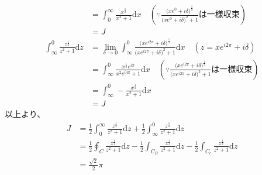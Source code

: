 \documentclass[dvipdfmx,a4paper]{jsarticle}
\begin{document}
\begin{align*}
 &= \int_{0}^{\infty} \frac{x^{\frac{1}{2}}}{x^2 + 1} \mathrm{d}x\quad(\because \frac{\bigl(xe^0 + i\delta\bigr)^{\frac{1}{2}}}{\bigl(xe^0 + i\delta\bigr)^2 + 1}は一様収束)\\
 &= J\\
  \int_{\infty}^{0} \frac{z^{\frac{1}{2}}}{z^2 + 1} \mathrm{d}z &= \lim_{\delta \to 0}\int_{\infty}^{0} \frac{\bigl(xe^{i2\pi} + i\delta\bigr)^{\frac{1}{2}}}{\bigl(xe^{i2\pi} + i\delta\bigr)^2 + 1} \mathrm{d}x \quad(z = xe^{i2\pi} + i\delta)\\
 &= \int_{\infty}^{0} \frac{x^{\frac{1}{2}}e^{i\pi}}{x^2e^{i4\pi} + 1} \mathrm{d}x\quad(\because\frac{\bigl(xe^{i2\pi} + i\delta\bigr)^{\frac{1}{2}}}{\bigl(xe^{i2\pi} + i\delta\bigr)^2 + 1}は一様収束)\\
 &= \int_{\infty}^{0} -\frac{x^{\frac{1}{2}}}{x^2 + 1} \mathrm{d}x\\
 &= J
 \end{align*}
 以上より、
 \begin{align*}
 J &= \frac{1}{2}\int_{0}^{\infty} \frac{z^{\frac{1}{2}}}{z^2 + 1} \mathrm{d}z + \frac{1}{2}\int_{\infty}^{0} \frac{z^{\frac{1}{2}}}{z^2 + 1} \mathrm{d}z \\
 &=\frac{1}{2}\oint_C\frac{z^{\frac{1}{2}}}{z^2 + 1}\mathrm{d}z - \frac{1}{2}\int_{C_R}\frac{z^{\frac{1}{2}}}{z^2 + 1}\mathrm{d}z - \frac{1}{2}\int_{C_{\epsilon}}\frac{z^{\frac{1}{2}}}{z^2 + 1}\mathrm{d}z\\
 &= \frac{\sqrt{2}}{2}\pi
 \end{align*}
 \\
 
\end{document}
